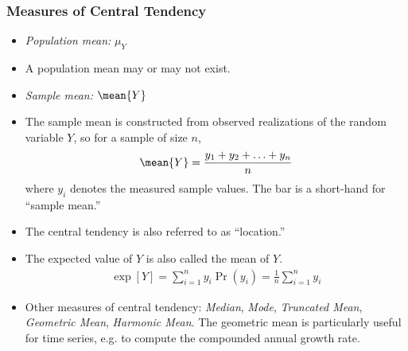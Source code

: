 

\begin{frame}
\frametitle{Measures of Central Tendency}
\begin{itemize}
\item \emph{Population mean:} \quad $\mu_{Y}$
\item A population mean may or may not exist. 
\item \emph{Sample mean:} \quad $\mean{Y}$
\item The sample mean is constructed from observed realizations of the random variable $Y$, so for a sample of size $n$,
\begin{align*}
\mean{Y} = \frac{y_1 + y_2 + \ldots + y_n}{n}
\end{align*}
where $y_i$ denotes the measured sample values. The bar is a short-hand for ``sample mean.''
\item The central tendency is also referred to as ``location.''
\item The expected value of $Y$ is also called the mean of $Y$.
\begin{align*}
\exp[Y] = \sum_{i=1}^n y_i \Pr(y_i) = \frac{1}{n}\sum_{i=1}^n y_i
\end{align*}
\item Other measures of central tendency: \emph{Median}, \emph{Mode}, \emph{Truncated Mean}, \emph{Geometric Mean}, \emph{Harmonic Mean}. 
The geometric mean is particularly useful for time series, e.g. to compute the compounded annual growth rate.
\end{itemize}
\end{frame}

